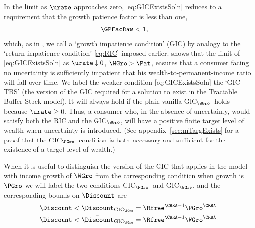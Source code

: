\documentclass{handout}
\begin{document}
\providecommand{\GICPGro}{GIC$_{\PGro}$}
\providecommand{\GICWGro}{GIC$_{\WGro}$}
In the limit as $\urate$ approaches zero, \eqref{eq:GICExistsSoln} reduces to a requirement that the growth patience factor is less than one,
\begin{equation}\begin{gathered}\begin{aligned}
  \GPFacRaw & <  1 \label{eq:GICPGro}
,\end{aligned}\end{gathered}\end{equation}
which, as in ,  we call a `growth impatience condition' (GIC) by analogy to the `return impatience condition' \eqref{eq:RIC} imposed earlier.   shows that the limit of \eqref{eq:GICExistsSoln} as $\urate \downarrow 0$, $\WGro > \Pat$, ensures that a consumer facing no uncertainty is sufficiently impatient that his wealth-to-permanent-income ratio will fall over time.  
We label the weaker condition \eqref{eq:GICExistsSoln} the `GIC-TBS' (the version of the GIC required for a solution to exist in the Tractable Buffer Stock model).  It will always hold if the plain-vanilla \GICWGro~holds because $\urate \geq 0$.  Thus, a consumer who, in the absence of uncertainty, would satisfy both the RIC and the \GICWGro, will have a positive finite target level of wealth when uncertainty is introduced.  (See appendix~\ref{sec:mTargExists} for a proof that the \GICPGro~condition is both necessary and sufficient for the existence of a target level of wealth.)

When it is useful to distinguish the version of the GIC that applies in the model with income growth of $\WGro$ from the corresponding condition when growth is $\PGro$ we will label the two conditions \GICPGro~and \GICWGro, and the corresponding bounds on $\Discount$ are 
\providecommand{\DiscountMaxGICPGro}{\bar{\Discount}_{\text{GIC}_\PGro}}
\providecommand{\DiscountMaxGICWGro}{\bar{\Discount}_{\text{GIC}_\WGro}}
\begin{equation}\begin{gathered}\begin{aligned}
   \Discount < \DiscountMaxGICPGro & =  \Rfree^{\CRRA-1}\PGro^{\CRRA}
\\ \Discount < \DiscountMaxGICWGro & =  \Rfree^{\CRRA-1}\WGro^{\CRRA}
\end{aligned}\end{gathered}\end{equation}
\end{document}

